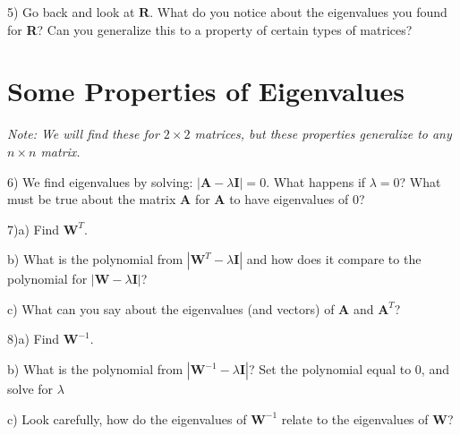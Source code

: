 \documentclass{article}
\begin{document}
\begin{flushleft}
5) Go back and look at $\textbf{R}$.  What do you notice about the eigenvalues you found for \textbf{R}?  Can you generalize this to a property of certain types of matrices?

\newpage

\section*{Some Properties of Eigenvalues}

\textit{ Note: We will find these for $2 \times 2$ matrices, but these properties generalize to any $n \times n$ matrix. }

\vspace{0.2in}

6) We find eigenvalues by solving: $|\textbf{A}- \lambda \textbf{I}  | =0 $. What happens if $\lambda = 0 $? What must be true about the matrix \textbf{A} for \textbf{A} to have eigenvalues of 0?

\vspace{1.5in}

7)a) Find $\textbf{W}^{T}$.

\vspace{1in}

b) What is the polynomial from $|\textbf{W}^{T}- \lambda \textbf{I}  | $ and how does it compare to the polynomial for $|\textbf{W}- \lambda \textbf{I}  | $?

\vspace{1in}

c) What can you say about the eigenvalues (and vectors) of $\textbf{A}$ and $\textbf{A}^{T}$?

\vspace{0.75in}

8)a) Find $\textbf{W}^{-1}$.

\vspace{1in}

b) What is the polynomial from $|\textbf{W}^{-1}- \lambda \textbf{I}  | $? Set the polynomial equal to 0, and solve for $\lambda$

\vspace{1in}

c) Look carefully, how do the eigenvalues of $\textbf{W}^{-1}$ relate to the eigenvalues of \textbf{W}?

\end{flushleft}
\end{document}
